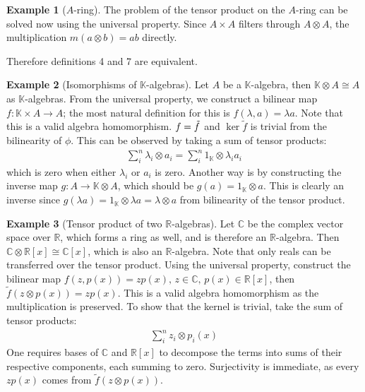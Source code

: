 \documentclass{article}
\theoremstyle{definition}
\newtheorem*{Example*}{Example}
\theoremstyle{remark}
\theoremstyle{underline}
\theoremstyle{underline}
\let\Im\relax
\DeclareMathOperator{\Im}{Im}
\begin{document}
	\begin{Example*}[$A$-ring]
		The problem of the tensor product on the $A$-ring can be solved now using the universal property. Since $A \times A$ filters through $A \otimes A$, the multiplication $m(a \otimes b) = ab$ directly.
	\end{Example*}

	Therefore definitions 4 and 7 are equivalent.
	
	\begin{Example*}[Isomorphisms of $\mathbb K$-algebras]
		Let $A$ be a $\mathbb K$-algebra, then $\mathbb K \otimes A \cong A$ as $\mathbb K$-algebras. From the universal property, we construct a bilinear map $f \colon \mathbb K \times A \to A$; the most natural definition for this is $f(\lambda, a) = \lambda a$. Note that this is a valid algebra homomorphism. $\Im f = \Im \tilde f$ and $\ker \tilde f$ is trivial from the bilinearity of $\phi$. This can be observed by taking a sum of tensor products:
		\begin{gather*}
			\sum_i^n \lambda_i \otimes a_i = \sum_i^n 1_{\mathbb K} \otimes \lambda_i a_i	
		\end{gather*}
		which is zero when either $\lambda_i$ or $a_i$ is zero. Another way is by constructing the inverse map $g \colon A \to \mathbb K \otimes A $, which should be $g(a) = 1_{\mathbb K} \otimes a$. This is clearly an inverse since $g(\lambda a) = 1_{\mathbb K} \otimes \lambda a = \lambda \otimes a$ from bilinearity of the tensor product.
	\end{Example*}

	\begin{Example*}[Tensor product of two $\mathbb R$-algebras]
		Let $\mathbb C$ be the complex vector space over $\mathbb R$, which forms a ring as well, and is therefore an $\mathbb R$-algebra. Then $\mathbb C \otimes \mathbb R[x] \cong \mathbb C[x]$, which is also an $\mathbb R$-algebra. Note that only reals can be transferred over the tensor product.
		Using the universal property, construct the bilinear map $f(z, p(x)) = zp(x),\, z \in \mathbb C,\, p(x) \in \mathbb R[x]$, then $\tilde f(z \otimes p(x)) = zp(x)$. This is a valid algebra homomorphism as the multiplication is preserved. To show that the kernel is trivial, take the sum of tensor products:
		\begin{gather*}
			\sum_i^n z_i \otimes p_i(x)
		\end{gather*}
		One requires bases of $\mathbb C$ and $\mathbb R[x]$ to decompose the terms into sums of their respective components, each summing to zero. Surjectivity is immediate, as every $zp(x)$ comes from $\tilde f(z \otimes p(x))$.
	\end{Example*}
\end{document}
